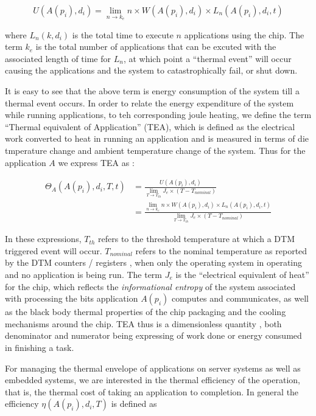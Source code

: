 \documentclass[times,10pt,onecolumn]{article}
\begin{document}
\begin{equation}
U(A(p_i),d_i) = \displaystyle \lim_{n \to k_e }n \times W(A(p_i),d_i) \times L_n(A(p_i),d_i,t) \nonumber
\end{equation}

where $L_n(k, d_i)$ is the total time to execute $n$ applications using
the chip. The term $k_e$ is the total number of applications that can be
excuted with the associated length of time for $L_n$, at which point a
``thermal event'' will occur causing the applications and the system to
catastrophically fail, or shut down.

It is easy to see that the above term is energy consumption of the
system till a thermal event occurs. In order to relate the energy
expenditure of the system while running applications, to teh
corresponding joule heating, we define the term ``Thermal equivalent of
Application'' (TEA), which is defined as the electrical work converted
to heat in running an application and is measured in terms of die
tmperature change and ambient temperature change of the system. Thus for
the application $A$ we express TEA as :

\begin{align}
\Theta_A(A(p_i),d_i, T, t) &= \frac{U(A(p_i),d_i)}{\displaystyle \lim_{T \to T_{th}} J_e \times (T - T_{nominal})}  \nonumber\\
					      &= \frac{\displaystyle \lim_{n \to k_e }n \times W(A(p_i),d_i) \times L_n(A(p_i),d_i,t)}{\displaystyle \lim_{T \to T_{th}} J_e \times (T - T_{nominal})} \nonumber
\end{align}

In these expressions, $T_{th}$ refers to the threshold temperature at
which a DTM triggered event will occur.  $T_{nominal}$ refers to the
nominal temperature as reported by the DTM counters / registers , when
only the operating system in operating and no application is being run.
The term $J_e$ is the ``electrical equivalent of heat'' for the chip,
which reflects the \textit{informational entropy} of the system
associated with processing the bits application $A(p_i)$ computes and
communicates, as well as the black body thermal properties of the chip
packaging and the cooling mechanisms around the chip. TEA thus is a
dimensionless quantity , both denominator and numerator being expressing
of work done or energy consumed in finishing a task.

For managing the thermal envelope of applications on server systems as
well as embedded systems, we are interested in the thermal efficiency of
the operation, that is, the thermal cost of taking an application to
completion. In general the efficiency $\eta(A(p_i), d_i,T)$ is defined
as
\end{document}
